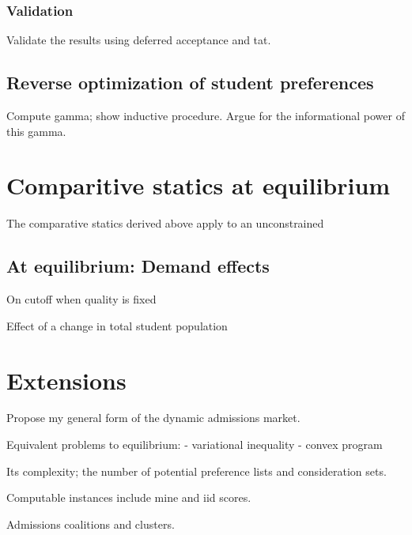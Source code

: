 \documentclass[12pt]{article}
\theoremstyle{definition}
\begin{document}
\subsubsection{Validation}
Validate the results using deferred acceptance and tat.








\subsection{Reverse optimization of student preferences}
Compute gamma; show inductive procedure. Argue for the informational power of this gamma. 



\section{Comparitive statics at equilibrium} \label{compstateq}
The comparative statics derived above apply to an unconstrained 
\subsection{At equilibrium: Demand effects}
On cutoff when quality is fixed

Effect of a change in total student population


\section{Extensions}
Propose my general form of the dynamic admissions market.

Equivalent problems to equilibrium:
- variational inequality
- convex program

Its complexity; the number of potential preference lists and consideration sets.

Computable instances include mine and iid scores.

Admissions coalitions and clusters. 
\pagebreak
\printbibliography
\end{document}
